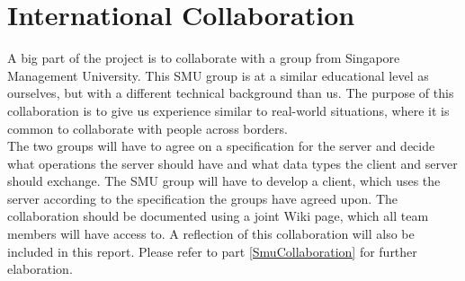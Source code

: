 \section{International Collaboration} \label{InternationCollaboration}
A big part of the project is to collaborate with a group from Singapore Management University. This SMU group is at a similar educational level as ourselves, but with a different technical background than us. The purpose of this collaboration is to give us experience similar to real-world situations, where it is common to collaborate with people across borders.\\
The two groups will have to agree on a specification for the server and decide what operations the server should have and what data types the client and server should exchange.
The SMU group will have to develop a client, which uses the server according to the specification the groups have agreed upon. The collaboration should be documented using a joint Wiki page, which all team members will have access to. A reflection of this collaboration will also be included in this report. Please refer to part \ref{SmuCollaboration} for further elaboration.

